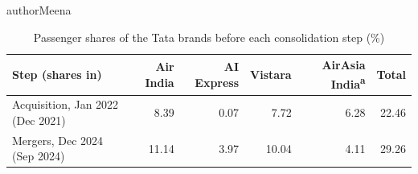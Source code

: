 \begin{authorcontribution}{authorMeena}
\begin{table}[H]
\centering
{}
\color{authorMeena}
\caption{Passenger shares of the Tata brands before each consolidation step (\%)}\label{tab:o2-tata}
\small
\begin{tabularx}{\linewidth}{|>{\raggedright\arraybackslash}X|r|r|r|r|r|}
\hline
\textbf{Step (shares in)} & \textbf{Air India} & \textbf{AI Express} & \textbf{Vistara} & \textbf{AirAsia India}\textsuperscript{a} & \textbf{Total} \\
\hline
Acquisition, Jan 2022 (Dec 2021) & 8.39 & 0.07 & 7.72 & 6.28 & 22.46 \\
\hline
Mergers, Dec 2024 (Sep 2024) & 11.14 & 3.97 & 10.04 & 4.11 & 29.26 \\
\hline
\end{tabularx}
\end{table}
\end{authorcontribution}
